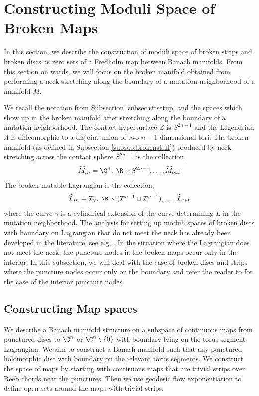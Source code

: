 \section{Constructing Moduli Space of Broken Maps } \label{sec:modcons}

In this section, we describe the construction of moduli space of broken strips and broken discs as zero sets of a Fredholm map between Banach manifolds. From this section on wards, we will focus on the broken manifold obtained from performing a neck-stretching along the boundary of a mutation neighborhood of a manifold $M$.

We recall the notation from  Subsection \ref{subsec:sftsetup} and the spaces which show up in the broken manifold after stretching along the boundary of a mutation neighborhood. The contact hypersurface $Z$ is $S^{2n-1}$ and the Legendrian $\Lambda$ is diffeomorphic to a disjoint union of two $n-1$ dimensional tori.  The broken manifold (as defined in Subsection \ref{subsub:brokenstuff}) produced by neck-stretching across the contact sphere $S^{2n-1}$ is the collection,
$$\widehat M_{in}=\C^n,\;  \R \times S^{2n-1}  , \dots , \widehat M_{out} $$
The broken mutable Lagrangian is the collection,
$$\widehat L_{in}=T_\gamma,\; \R \times (T_+^{n-1} \sqcup T_-^{n-1})  , \dots , \widehat L_{out} $$
where the curve $\gamma$ is a cylindrical extension of the curve determining $L$ in the mutation neighborhood. The analysis for setting up moduli spaces of broken discs with boundary on Lagrangian that do not meet the neck has already been developed in the literature, see e.g. \cite{floerflip}. In the situation where the Lagrangian does not meet the neck, the puncture nodes in the broken maps occur only in the interior. In this subsection,  we will deal with the case of broken discs and strips where the puncture nodes occur only on the boundary and refer the reader to \cite{floerflip} for the case of the interior puncture nodes.


\subsection{Constructing Map spaces}

We describe a Banach manifold structure on a subspace of continuous maps from punctured discs to $\C^n$ or $\C^n\setminus \{0\}$ with boundary lying on the torus-segment Lagrangian. We aim to construct a Banach manifold such that any punctured holomorphic disc with boundary on the relevant torus segments. We construct the space of maps by starting with continuous maps that are trivial strips over Reeb chords near the punctures. Then we use geodesic flow exponentiation to define open sets around the maps with trivial strips.

